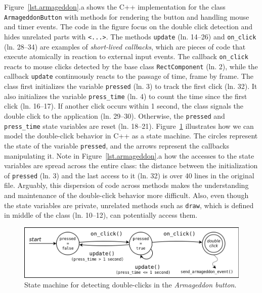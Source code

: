 \documentclass{vgtc}                          %
\newcommand{\code}[1] {{\small{\texttt{#1}}}}
\begin{document}
Figure~\ref{lst.armageddon}.a shows the C++ implementation for the class
\code{ArmageddonButton} with methods for rendering the button and handling
mouse and timer events.
The code in the figure focus on the double click detection and hides unrelated
parts with \code{<...>}.
%
The methods \code{update} (ln. 14--26) and \code{on\_click} (ln. 28--34) are
examples of \emph{short-lived callbacks}, which are pieces of code that execute
atomically in reaction to external input events.
The callback \code{on\_click} reacts to mouse clicks detected by the base class
\code{RectComponent} (ln. 2), while the callback \code{update} continuously
reacts to the passage of time, frame by frame.
%
The class first initializes the variable \code{pressed} (ln. 3) to track the
first click (ln. 32).
It also initializes the variable \code{press\_time} (ln. 4) to count the time
since the first click (ln. 16--17).
If another click occurs within 1 second, the class signals the double click to
the application (ln. 29--30).
Otherwise, the \code{pressed} and \code{press\_time} state variables are reset
(ln. 18--21). 
%
Figure~\ref{fig.armageddon.fsm} illustrates how we can model the double-click 
behavior in C++ as a state machine.
The circles represent the state of the variable \code{pressed}, and the arrows 
represent the callbacks manipulating it.
%
Note in Figure~\ref{lst.armageddon}.a how the accesses to the state variables
are spread across the entire class: the distance between the initialization of
\code{pressed} (ln.  3) and the last access to it (ln. 32) is over 40 lines in
the original file.
Arguably, this dispersion of code across methods makes the understanding and 
maintenance of the double-click behavior more difficult.
Also, even though the state variables are private, unrelated methods such as 
\code{draw}, which is defined in middle of the class (ln. 10--12), can
potentially access them.

\begin{figure}[t]
\centering
\includegraphics[width=\columnwidth]{double-click}
\caption{State machine for detecting double-clicks in the
         \emph{Armageddon button}.
\label{fig.armageddon.fsm}
}
\end{figure}
\end{document}
